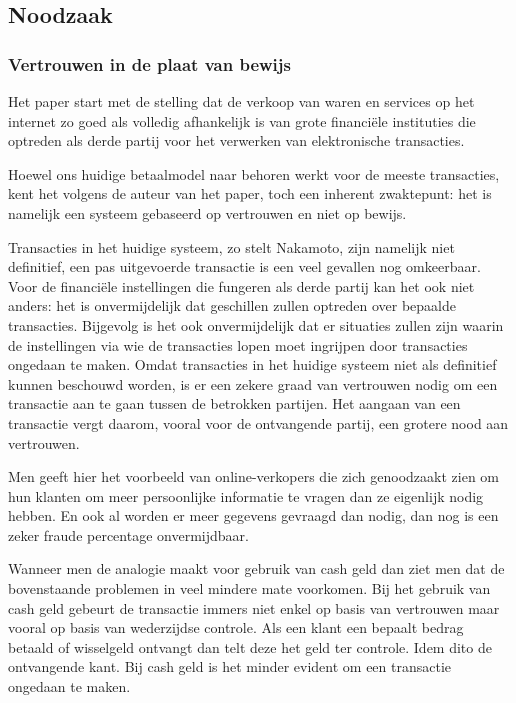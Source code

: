 	\subsection{Noodzaak}
			\subsubsection{Vertrouwen in de plaat van bewijs}
			Het paper start met de stelling dat de verkoop van waren en services op het internet zo goed als volledig afhankelijk is van grote financiële instituties die optreden als derde partij voor het verwerken van elektronische transacties. 
		
			Hoewel ons huidige betaalmodel naar behoren werkt voor de meeste transacties, kent het volgens de auteur van het paper, toch een inherent zwaktepunt: het is namelijk een systeem gebaseerd op vertrouwen en niet op bewijs.
			
			Transacties in het huidige systeem, zo stelt Nakamoto, zijn namelijk niet definitief, een pas uitgevoerde transactie is een veel gevallen nog omkeerbaar. Voor de financiële instellingen die fungeren als derde partij kan het ook niet anders: het is onvermijdelijk dat geschillen zullen optreden over bepaalde transacties. Bijgevolg is het ook onvermijdelijk dat er situaties zullen zijn waarin de instellingen via wie de transacties lopen moet ingrijpen door transacties ongedaan te maken. Omdat transacties in het huidige systeem niet als definitief kunnen beschouwd worden, is er een zekere graad van vertrouwen nodig om een transactie aan te gaan tussen de betrokken partijen.  Het aangaan van een transactie vergt daarom, vooral voor de ontvangende partij, een grotere nood aan vertrouwen. 
			
			Men geeft hier het voorbeeld van online-verkopers die zich genoodzaakt zien om hun klanten om meer persoonlijke informatie te vragen dan ze eigenlijk nodig hebben. En ook al worden er meer gegevens gevraagd dan nodig, dan nog is een zeker fraude percentage onvermijdbaar. 
		
			Wanneer men de analogie maakt voor gebruik van cash geld dan ziet men dat de bovenstaande problemen in veel mindere mate voorkomen. Bij het gebruik van cash geld gebeurt de transactie immers niet enkel op basis van vertrouwen maar vooral op basis van wederzijdse controle. Als een klant een bepaalt bedrag betaald of wisselgeld ontvangt dan telt deze het geld ter controle. Idem dito de ontvangende kant. Bij cash geld is het minder evident om een transactie ongedaan te maken. 
			

